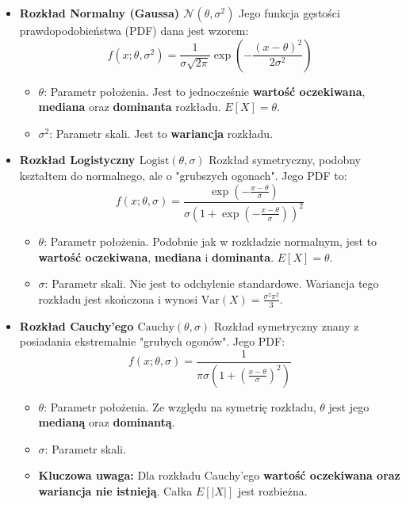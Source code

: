 \documentclass[a4paper,12pt]{article}
\begin{document}
\begin{itemize}
    \item \textbf{Rozkład Normalny (Gaussa) $\mathcal{N}(\theta, \sigma^2)$}
    Jego funkcja gęstości prawdopodobieństwa (PDF) dana jest wzorem:
    \[ f(x; \theta, \sigma^2) = \frac{1}{\sigma\sqrt{2\pi}} \exp\left(-\frac{(x-\theta)^2}{2\sigma^2}\right) \]
    \begin{itemize}
        \item $\theta$: Parametr położenia. Jest to jednocześnie \textbf{wartość oczekiwana}, \textbf{mediana} oraz \textbf{dominanta} rozkładu. $E[X] = \theta$.
        \item $\sigma^2$: Parametr skali. Jest to \textbf{wariancja} rozkładu.
    \end{itemize}
    
    \item \textbf{Rozkład Logistyczny $\text{Logist}(\theta, \sigma)$}
    Rozkład symetryczny, podobny kształtem do normalnego, ale o "grubszych ogonach". Jego PDF to:
    \[ f(x; \theta, \sigma) = \frac{\exp\left(-\frac{x-\theta}{\sigma}\right)}{\sigma\left(1 + \exp\left(-\frac{x-\theta}{\sigma}\right)\right)^2} \]
    \begin{itemize}
        \item $\theta$: Parametr położenia. Podobnie jak w rozkładzie normalnym, jest to \textbf{wartość oczekiwana}, \textbf{mediana} i \textbf{dominanta}. $E[X] = \theta$.
        \item $\sigma$: Parametr skali. Nie jest to odchylenie standardowe. Wariancja tego rozkładu jest skończona i wynosi $\text{Var}(X) = \frac{\sigma^2 \pi^2}{3}$.
    \end{itemize}

    \item \textbf{Rozkład Cauchy'ego $\text{Cauchy}(\theta, \sigma)$}
    Rozkład symetryczny znany z posiadania ekstremalnie "grubych ogonów". Jego PDF:
    \[ f(x; \theta, \sigma) = \frac{1}{\pi\sigma \left(1 + \left(\frac{x-\theta}{\sigma}\right)^2\right)} \]
    \begin{itemize}
        \item $\theta$: Parametr położenia. Ze względu na symetrię rozkładu, $\theta$ jest jego \textbf{medianą} oraz \textbf{dominantą}.
        \item $\sigma$: Parametr skali.
        \item \textbf{Kluczowa uwaga:} Dla rozkładu Cauchy'ego \textbf{wartość oczekiwana oraz wariancja nie istnieją}. Całka $E[|X|]$ jest rozbieżna.
    \end{itemize}
\end{itemize}
\end{document}
